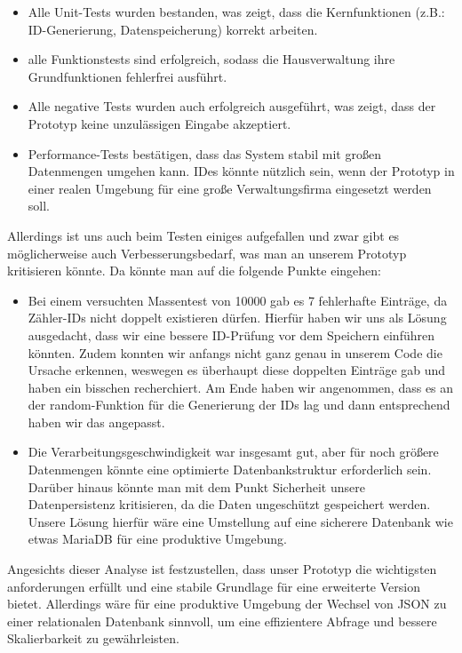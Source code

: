 \begin{itemize}
    \item Alle Unit-Tests wurden bestanden, was zeigt, dass die Kernfunktionen (z.B.: ID-Generierung, Datenspeicherung) korrekt arbeiten.
    \item alle Funktionstests sind erfolgreich, sodass die Hausverwaltung ihre Grundfunktionen fehlerfrei ausführt.
    \item Alle negative Tests wurden auch erfolgreich ausgeführt, was zeigt, dass der Prototyp keine unzulässigen Eingabe akzeptiert.
    \item Performance-Tests bestätigen, dass das System stabil mit großen Datenmengen umgehen kann.
    IDes könnte nützlich sein, wenn der Prototyp in einer realen Umgebung für eine große Verwaltungsfirma eingesetzt werden soll.
\end{itemize}

Allerdings ist uns auch beim Testen einiges aufgefallen und zwar gibt es möglicherweise auch Verbesserungsbedarf, was man an unserem Prototyp kritisieren könnte.
Da könnte man auf die folgende Punkte eingehen:
\begin{itemize}
    \item Bei einem versuchten Massentest von 10000 gab es 7 fehlerhafte Einträge, da Zähler-IDs nicht doppelt existieren dürfen.
    Hierfür haben wir uns als Lösung ausgedacht, dass wir eine bessere ID-Prüfung vor dem Speichern einführen könnten.
    Zudem konnten wir anfangs nicht ganz genau in unserem Code die Ursache erkennen,
    weswegen es überhaupt diese doppelten Einträge gab und haben ein bisschen recherchiert. Am Ende haben wir angenommen,
    dass es an der random-Funktion für die Generierung der IDs lag und dann entsprechend haben wir das angepasst.
    \item Die Verarbeitungsgeschwindigkeit war insgesamt gut, aber für noch größere Datenmengen könnte eine optimierte Datenbankstruktur erforderlich sein.
    Darüber hinaus könnte man mit dem Punkt Sicherheit unsere Datenpersistenz kritisieren, da die Daten ungeschützt gespeichert werden.
    Unsere Lösung hierfür wäre eine Umstellung auf eine sicherere Datenbank wie etwas MariaDB für eine produktive Umgebung.
\end{itemize}

Angesichts dieser Analyse ist festzustellen, dass unser Prototyp die wichtigsten anforderungen erfüllt und eine stabile Grundlage für eine erweiterte Version bietet.
Allerdings wäre für eine produktive Umgebung der Wechsel von JSON zu einer relationalen Datenbank sinnvoll, um eine effizientere Abfrage und bessere Skalierbarkeit zu gewährleisten.
